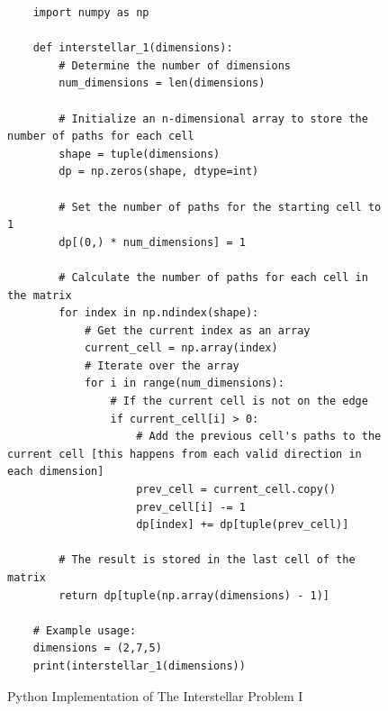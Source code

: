 \begin{figure}[H]
    \centering
    \begin{lstlisting}
    import numpy as np

    def interstellar_1(dimensions):
        # Determine the number of dimensions
        num_dimensions = len(dimensions)
    
        # Initialize an n-dimensional array to store the number of paths for each cell
        shape = tuple(dimensions)
        dp = np.zeros(shape, dtype=int)
    
        # Set the number of paths for the starting cell to 1
        dp[(0,) * num_dimensions] = 1
    
        # Calculate the number of paths for each cell in the matrix
        for index in np.ndindex(shape):
            # Get the current index as an array
            current_cell = np.array(index)
            # Iterate over the array
            for i in range(num_dimensions):
                # If the current cell is not on the edge
                if current_cell[i] > 0:
                    # Add the previous cell's paths to the current cell [this happens from each valid direction in each dimension]
                    prev_cell = current_cell.copy()
                    prev_cell[i] -= 1
                    dp[index] += dp[tuple(prev_cell)]
    
        # The result is stored in the last cell of the matrix
        return dp[tuple(np.array(dimensions) - 1)]
    
    # Example usage:
    dimensions = (2,7,5)
    print(interstellar_1(dimensions))
    \end{lstlisting}
    \caption{Python Implementation of The Interstellar Problem I}
    \label{fig:nd-unique-paths}
\end{figure}

